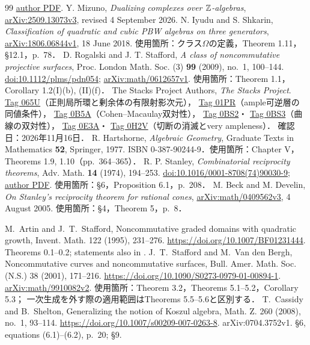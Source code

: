 \documentclass[11pt,a4paper]{ltjsarticle}
\begin{document}
\begin{thebibliography}{99}
\href{https://www.math.bgu.ac.il/~amyekut/publications/nc-serre/paper.pdf}{author PDF}.
 Y. Mizuno,
\emph{Dualizing complexes over $\mathbb Z$-algebras},
\href{https://arxiv.org/abs/2509.13073}{arXiv:2509.13073v3}, revised 4 September 2026.
 N. Iyudu and S. Shkarin,
\emph{Classification of quadratic and cubic PBW algebras on three generators},
\href{https://arxiv.org/abs/1806.06844v1}{arXiv:1806.06844v1}, 18 June 2018.
使用箇所：クラス$\Omega$の定義，Theorem 1.11，\S12.1，p.~78．
 D. Rogalski and J. T. Stafford,
\emph{A class of noncommutative projective surfaces},
Proc. London Math. Soc. (3) \textbf{99} (2009), no.~1, 100--144.
\href{https://doi.org/10.1112/plms/pdn054}{doi:10.1112/plms/pdn054};
\href{https://arxiv.org/abs/math/0612657}{arXiv:math/0612657v1}.
使用箇所：Theorem 1.1，Corollary 1.2(I)(b), (II)(f)．
 The Stacks Project Authors, \emph{The Stacks Project}.
\href{https://stacks.math.columbia.edu/tag/065U}{Tag 065U}（正則局所環と剰余体の有限射影次元），
\href{https://stacks.math.columbia.edu/tag/01PR}{Tag 01PR}（ample可逆層の同値条件），
\href{https://stacks.math.columbia.edu/tag/0B5A}{Tag 0B5A}（Cohen--Macaulay双対性），
\href{https://stacks.math.columbia.edu/tag/0BS2}{Tag 0BS2}・
\href{https://stacks.math.columbia.edu/tag/0BS3}{Tag 0BS3}（曲線の双対性），
\href{https://stacks.math.columbia.edu/tag/0E3A}{Tag 0E3A}・
\href{https://stacks.math.columbia.edu/tag/0H2V}{Tag 0H2V}（切断の消滅とvery ampleness）．
確認日：2026年11月16日．
 R. Hartshorne, \emph{Algebraic Geometry},
Graduate Texts in Mathematics \textbf{52}, Springer, 1977.
ISBN 0-387-90244-9．使用箇所：Chapter V，Theorems 1.9, 1.10（pp.~364--365）．
 R. P. Stanley,
\emph{Combinatorial reciprocity theorems}, Adv. Math. \textbf{14} (1974), 194--253.
\href{https://doi.org/10.1016/0001-8708(74)90030-9}{doi:10.1016/0001-8708(74)90030-9};
\href{https://math.mit.edu/~rstan/pubs/pubfiles/22.pdf}{author PDF}.
使用箇所：\S6，Proposition 6.1，p.~208．
 M. Beck and M. Develin,
\emph{On Stanley's reciprocity theorem for rational cones},
\href{https://arxiv.org/abs/math/0409562v3}{arXiv:math/0409562v3}, 4 August 2005.
使用箇所：\S4，Theorem 5，p.~8．

 M.~Artin and J.~T.~Stafford,
Noncommutative graded domains with quadratic growth,
Invent. Math. 122 (1995), 231--276.
\url{https://doi.org/10.1007/BF01231444}.
Theorems 0.1--0.2; statements also in \cite[Theorems 5.1--5.2]{SVdBsurvey}.
 J.~T.~Stafford and M.~Van den Bergh,
Noncommutative curves and noncommutative surfaces,
Bull. Amer. Math. Soc. (N.S.) 38 (2001), 171--216.
\url{https://doi.org/10.1090/S0273-0979-01-00894-1}.
\href{https://arxiv.org/abs/math/9910082}{arXiv:math/9910082v2}.
使用箇所：Theorem 3.2，Theorems 5.1--5.2，Corollary 5.3；
一次生成を外す際の適用範囲はTheorems 5.5--5.6と区別する．
 T.~Cassidy and B.~Shelton,
Generalizing the notion of Koszul algebra,
Math. Z. 260 (2008), no.~1, 93--114.
\url{https://doi.org/10.1007/s00209-007-0263-8}.
arXiv:0704.3752v1.
\S6, equations (6.1)--(6.2), p.~20; \S9.



\end{thebibliography}
\end{document}
